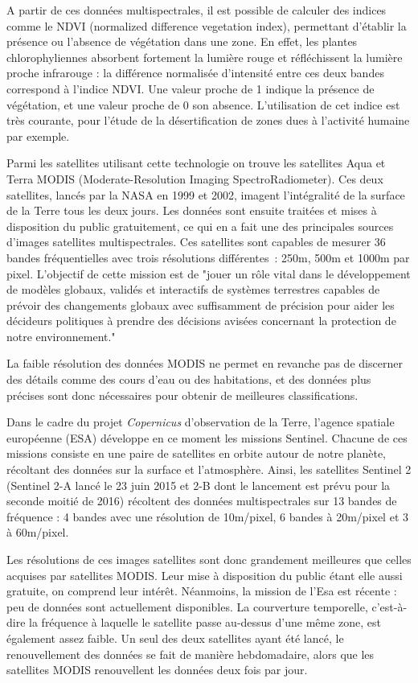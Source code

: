 A partir de ces données multispectrales, il est possible de calculer des indices comme le NDVI (normalized difference vegetation index), permettant d'établir la présence ou l'absence de végétation dans une zone. En effet, les plantes chlorophyliennes absorbent fortement la lumière rouge et réfléchissent la lumière proche infrarouge : la différence normalisée d'intensité entre ces deux bandes correspond à l'indice NDVI. Une valeur proche de 1 indique la présence de végétation, et une valeur proche de 0 son absence. L'utilisation de cet indice est très courante, pour l'étude de la désertification de zones dues à l'activité humaine\cite{desert} par exemple.

Parmi les satellites utilisant cette technologie on trouve les satellites Aqua et Terra MODIS (Moderate-Resolution Imaging SpectroRadiometer). Ces deux satellites, lancés par la NASA en 1999 et 2002, imagent l'intégralité de la surface de la Terre tous les deux jours. Les données sont ensuite traitées et mises à disposition du public gratuitement, ce qui en a fait une des principales sources d'images satellites multispectrales. Ces satellites sont capables de mesurer 36 bandes fréquentielles avec trois résolutions différentes : 250m, 500m et 1000m par pixel\cite{nasa}. L'objectif de cette mission est de "jouer un rôle vital dans le développement de modèles globaux, validés et interactifs de systèmes terrestres capables de prévoir des changements globaux avec suffisamment de précision pour aider les décideurs politiques à prendre des décisions avisées concernant la protection de notre environnement."

La faible résolution des données MODIS ne permet en revanche pas de discerner des détails comme des cours d'eau ou des habitations, et des données plus précises sont donc nécessaires pour obtenir de meilleures classifications. 

Dans le cadre du projet \textit{Copernicus} d'observation de la Terre, l'agence spatiale européenne (ESA) développe en ce moment les missions Sentinel. Chacune de ces missions consiste en une paire de satellites en orbite autour de notre planète, récoltant des données sur la surface et l'atmosphère. Ainsi, les satellites Sentinel 2 (Sentinel 2-A lancé le 23 juin 2015 et 2-B dont le lancement est prévu pour la seconde moitié de 2016)\cite{sent2} récoltent des données multispectrales sur 13 bandes de fréquence : 4 bandes avec une résolution de 10m/pixel, 6 bandes à 20m/pixel et 3 à 60m/pixel.

Les résolutions de ces images satellites sont donc grandement meilleures que celles acquises par satellites MODIS. Leur mise à disposition du public étant elle aussi gratuite, on comprend leur intérêt. 
Néanmoins, la mission de l'Esa est récente : peu de données sont actuellement disponibles. La courverture temporelle, c'est-à-dire la fréquence à laquelle le satellite passe au-dessus d'une même zone, est également assez faible. Un seul des deux satellites ayant été lancé, le renouvellement des données se fait de manière hebdomadaire, alors que les satellites MODIS renouvellent les données deux fois par jour. 

